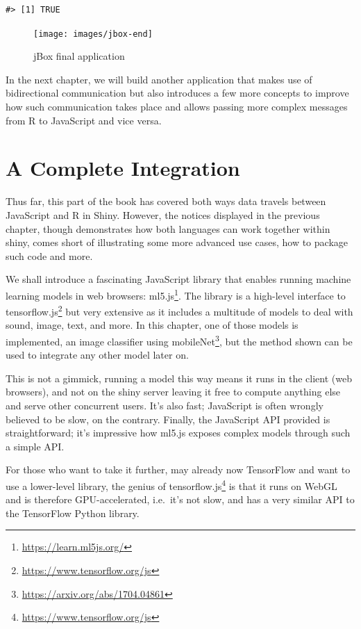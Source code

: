 \documentclass[10pt,]{krantz}
\renewcommand{\href}[2]{#2\footnote{\url{#1}}}
\begin{document}
\begin{verbatim}
#> [1] TRUE
\end{verbatim}

\begin{figure}[H]

{\centering \texttt{[image: images/jbox-end]} 

}

\caption{jBox final application}\label{fig:jbox-end}
\end{figure}

In the next chapter, we will build another application that makes use of bidirectional communication but also introduces a few more concepts to improve how such communication takes place and allows passing more complex messages from R to JavaScript and vice versa.

\hypertarget{shiny-complete}{%
\chapter{A Complete Integration}\label{shiny-complete}}

Thus far, this part of the book has covered both ways data travels between JavaScript and R in Shiny. However, the notices displayed in the previous chapter, though demonstrates how both languages can work together within shiny, comes short of illustrating some more advanced use cases, how to package such code and more.

We shall introduce a fascinating JavaScript library that enables running machine learning models in web browsers: \href{https://learn.ml5js.org/}{ml5.js}. The library is a high-level interface to \href{https://www.tensorflow.org/js}{tensorflow.js} but very extensive as it includes a multitude of models to deal with sound, image, text, and more. In this chapter, one of those models is implemented, an image classifier using \href{https://arxiv.org/abs/1704.04861}{mobileNet}, but the method shown can be used to integrate any other model later on.

This is not a gimmick, running a model this way means it runs in the client (web browsers), and not on the shiny server leaving it free to compute anything else and serve other concurrent users. It's also fast; JavaScript is often wrongly believed to be slow, on the contrary. Finally, the JavaScript API provided is straightforward; it's impressive how ml5.js exposes complex models through such a simple API.

For those who want to take it further, may already now TensorFlow and want to use a lower-level library, the genius of \href{https://www.tensorflow.org/js}{tensorflow.js} is that it runs on WebGL and is therefore GPU-accelerated, i.e.~it's not slow, and has a very similar API to the TensorFlow Python library.
\end{document}
